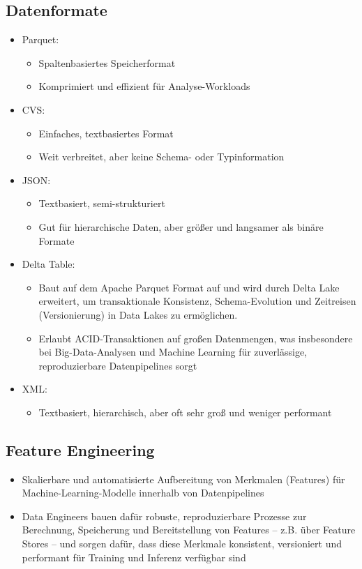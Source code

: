 \documentclass[11pt]{scrartcl}
\begin{document}
\subsection{Datenformate}
\begin{itemize}
	\item Parquet:
	\begin{itemize}
		\item Spaltenbasiertes Speicherformat
		\item Komprimiert und effizient für Analyse-Workloads
	\end{itemize}
	\item CVS:
	\begin{itemize}
		\item Einfaches, textbasiertes Format
		\item Weit verbreitet, aber keine Schema- oder Typinformation
	\end{itemize}
	\item JSON:
	\begin{itemize}
		\item Textbasiert, semi-strukturiert
		\item Gut für hierarchische Daten, aber größer und langsamer als binäre Formate
	\end{itemize}
	\item Delta Table:
	\begin{itemize}
		\item Baut auf dem Apache Parquet Format auf und wird durch Delta Lake erweitert, um transaktionale Konsistenz, Schema-Evolution und Zeitreisen (Versionierung) in Data Lakes zu ermöglichen.
		\item Erlaubt ACID-Transaktionen auf großen Datenmengen, was insbesondere bei Big-Data-Analysen und Machine Learning für zuverlässige, reproduzierbare Datenpipelines sorgt
	\end{itemize}
	\item XML:
	\begin{itemize}
		\item Textbasiert, hierarchisch, aber oft sehr groß und weniger performant
	\end{itemize}
\end{itemize}


\subsection{Feature Engineering}
\begin{itemize}
	\item Skalierbare und automatisierte Aufbereitung von Merkmalen (Features) für Machine-Learning-Modelle innerhalb von Datenpipelines
	\item Data Engineers bauen dafür robuste, reproduzierbare Prozesse zur Berechnung, Speicherung und Bereitstellung von Features – z.B. über Feature Stores – und sorgen dafür, dass diese Merkmale konsistent, versioniert und performant für Training und Inferenz verfügbar sind
\end{itemize}
\end{document}
